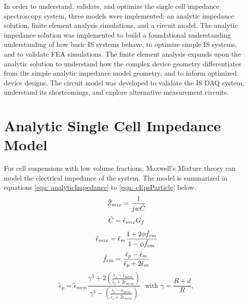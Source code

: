 \label{ch: modeling}

\par In order to understand, validate, and optimize the single cell impedance spectroscopy system, three models were implemented: an analytic impedance solution, finite element analysis simulations, and a circuit model. The analytic impedance solution was implemented to build a foundational understanding understanding of how basic IS systems behave, to optimize simple IS systems, and to validate FEA simulations. The finite element analysis expands upon the analytic solution to understand how the complex device geometry differentiates from the simple analytic impedance model geometry, and to inform optimized device designs. The circuit model was developed to validate the IS DAQ system, understand its shortcomings, and explore alternative measurement circuits.

\section{Analytic Single Cell Impedance Model}
\par For cell suspensions with low volume fractions, Maxwell's Mixture theory can model the electrical impedance of the system. The model is summarized in equations \ref{eqn: analyticImpedance} to \ref{eqn: cEpsParticle} below. 
\begin{equation}
    \Tilde{Z}_{mix} = \frac{1}{jw\Tilde{C}}
    \label{eqn: analyticImpedance}
\end{equation}
\begin{equation}
    \Tilde{C} = \Tilde{\epsilon}_{mix}G_f    
\end{equation}
\begin{equation}
    \Tilde{\epsilon}_{mix} = \Tilde{\epsilon}_m \frac{1 + 2\phi\Tilde{f}_{cm}}{1-\phi\Tilde{f}_{cm}}
\end{equation}
\begin{equation}
 \Tilde{f}_{cm} = \frac{\Tilde{\epsilon}_p - \Tilde{\epsilon}_{m}}{\Tilde{\epsilon}_p + 2\Tilde{\epsilon}_m}
\end{equation}
\begin{equation}
      \tilde{\epsilon}_p = \tilde{\epsilon}_{mem} 
      \frac{\gamma^3+2(\frac{\tilde{\epsilon}_i - \tilde{\epsilon}_{mem}}
      {\tilde{\epsilon}_i + 2\tilde{\epsilon}_{mem}})}{\gamma^3 - (\frac{\tilde{\epsilon}_i - \tilde{\epsilon}_{mem}}{\tilde{\epsilon}_i + 2\tilde{\epsilon}_{mem}})} \;\text{  with  } 
      \gamma = \frac{R + d}{R},
      \label{eqn: cEpsParticle}
\end{equation}

